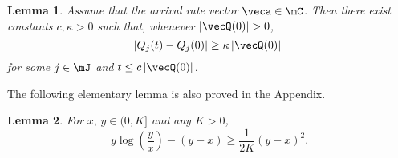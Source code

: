 \documentclass{amsart}
\newtheorem{lemma}{Lemma}
\begin{document}
\begin{lemma} \label{bound.change.Q}
Assume that the arrival rate vector $\veca \in \mC$.  Then
there exist constants $c,  \kappa>0$ such that, whenever $|\vecQ(0)|>0$, 
\begin{equation}
\label{eqnewkappa}
   |Q_j(t) - Q_j(0)| \geq \kappa \, |\vecQ(0)|\ 
\end{equation}
for some $j\in\mJ$ 
and $t \le c \, |\vecQ(0)|$.
\end{lemma}
\iffalse
\begin{lemma}\label{lm:log.bound}
For $x,\, y \in (0,K]$ 
\begin{equation}\label{eq:log.bound}
y\log \left(\frac{y}{x}\right) - (y-x) \geq \frac{1}{2 K} \left(y-x \right)^2.
\end{equation}
\end{lemma}
\begin{proof}
Let 
$F(z) = z\log z - (z-1)$, with $F\rq{}(z)= \log z$ and $F\rq{}\rq{}(z) = z^{-1}$. Taking a Taylor expansion around $1$, with $F(1)=0$, for some $\theta \in(1,z)$, 
$$
F(z) = F\rq{}(1) (z-1) + \frac{1}{2} F\rq{}\rq{}(\theta) (z-1)^2 
= \frac{1}{2\theta} (z-1)^2 \geq \frac{1}{2 (1\vee z )} (z-1)^2 \ .
$$
The last equality, holds since $\theta \leq (1 \vee z)$. 
Noticing that the left hand side of \eqref{eq:log.bound} is equal to $x\, F(y/x)$ the result follos by the following relation
$$
 x F(y/x) 
 \geq \frac{x}{2 (1\vee \frac{y}{x} )} \left(\frac{y}{x}-1\right)^2
= \frac{1}{2 (x\vee y) } (y-x)^2 
 \geq \frac{1}{2 K} (y-x)^2 \ .
$$
\end{proof}
\fi

\iffalse
\begin{lemma}\label{lm:H.bound}
For appropriate constants $h_1, \, h_2>0$, 
\begin{equation}\label{eq:H.bounds}
h_1 |\vecQ(t)|
\leq H(t) \leq 
h_2 |\vecQ(t)|
\end{equation}
\end{lemma}
\begin{proof}
\end{proof}
\fi

The following elementary lemma is also proved in the Appendix.

\begin{lemma}\label{lm:log.bound}
For $x,\, y \in (0,K]$ and any $K>0$,
\begin{equation*}
y\log \left(\frac{y}{x}\right) - (y-x) \geq \frac{1}{2 K} \left(y-x \right)^2.
\end{equation*}
\end{lemma}
\end{document}

